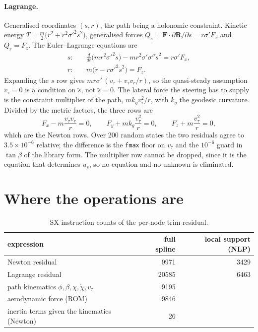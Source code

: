 \documentclass[11pt,a4paper]{article}
\newcommand{\code}[1]{\texttt{#1}}
\newcommand{\vect}[1]{\boldsymbol{#1}}
\begin{document}
\paragraph{Lagrange.} Generalised coordinates $(s, r)$, the path being a
holonomic constraint. Kinetic energy
$T = \tfrac{m}{2}\bigl(\dot r^2 + r^2\sigma'^2\dot s^2\bigr)$, generalised
forces $Q_s = \vect F\cdot\partial\vect R/\partial s = r\sigma' F_x$ and
$Q_r = F_z$. The Euler--Lagrange equations are
\begin{align}
  s:&\quad \frac{d}{dt}\bigl(m r^2\sigma'^2\dot s\bigr) - m r^2\sigma'\sigma''\dot s^2 = r\sigma' F_x, \\
  r:&\quad m\bigl(\ddot r - r\sigma'^2\dot s^2\bigr) = F_z .
\end{align}
Expanding the $s$ row gives $m r\sigma'\,(\dot v_\tau + v_\tau v_r / r)$, so the
quasi-steady assumption $\dot v_\tau = 0$ is a condition on $\ddot s$, not
$\ddot s = 0$. The lateral force the steering has to supply is the constraint
multiplier of the path, $m k_g v_\tau^2 / r$, with $k_g$ the geodesic
curvature. Divided by the metric factors, the three rows are
\begin{equation}
  F_x - m\frac{v_\tau v_r}{r} = 0, \qquad
  F_y + m k_g\frac{v_\tau^2}{r} = 0, \qquad
  F_z + m\frac{v_\tau^2}{r} = 0,
\end{equation}
which are the Newton rows. Over 200 random states the two residuals agree to
$3.5\times10^{-6}$ relative; the difference is the \code{fmax} floor on
$v_\tau$ and the $10^{-6}$ guard in $\tan\beta$ of the library form. The
multiplier row cannot be dropped, since it is the equation that determines
$u_s$, so no equation and no unknown is eliminated.

\section{Where the operations are}

\begin{table}[h]
\centering
\caption{SX instruction counts of the per-node trim residual.}
\begin{tabular}{lrr}
\toprule
expression & full spline & local support (NLP) \\
\midrule
Newton residual & 9971 & 3429 \\
Lagrange residual & 20585 & 6463 \\
path kinematics $\phi, \beta, \chi, \dot\chi, v_\tau$ & 9195 & \\
aerodynamic force (ROM) & 9846 & \\
inertia terms given the kinematics (Newton) & 26 & \\
\bottomrule
\end{tabular}
\end{table}
\end{document}
